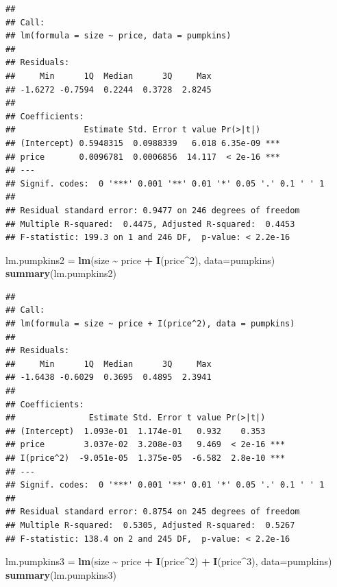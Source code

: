 \documentclass[
]{book}
\newenvironment{Shaded}{\begin{snugshade}}{\end{snugshade}}
\newcommand{\AttributeTok}[1]{\textcolor[rgb]{0.13,0.29,0.53}{#1}}
\newcommand{\DecValTok}[1]{\textcolor[rgb]{0.00,0.00,0.81}{#1}}
\newcommand{\FunctionTok}[1]{\textcolor[rgb]{0.13,0.29,0.53}{\textbf{#1}}}
\newcommand{\NormalTok}[1]{#1}
\newcommand{\OtherTok}[1]{\textcolor[rgb]{0.56,0.35,0.01}{#1}}
\newcommand{\SpecialCharTok}[1]{\textcolor[rgb]{0.81,0.36,0.00}{\textbf{#1}}}
\begin{document}
\begin{verbatim}
## 
## Call:
## lm(formula = size ~ price, data = pumpkins)
## 
## Residuals:
##     Min      1Q  Median      3Q     Max 
## -1.6272 -0.7594  0.2244  0.3728  2.8245 
## 
## Coefficients:
##              Estimate Std. Error t value Pr(>|t|)    
## (Intercept) 0.5948315  0.0988339   6.018 6.35e-09 ***
## price       0.0096781  0.0006856  14.117  < 2e-16 ***
## ---
## Signif. codes:  0 '***' 0.001 '**' 0.01 '*' 0.05 '.' 0.1 ' ' 1
## 
## Residual standard error: 0.9477 on 246 degrees of freedom
## Multiple R-squared:  0.4475, Adjusted R-squared:  0.4453 
## F-statistic: 199.3 on 1 and 246 DF,  p-value: < 2.2e-16
\end{verbatim}

\begin{Shaded}
\begin{Highlighting}[]
\NormalTok{lm.pumpkins2 }\OtherTok{=}  \FunctionTok{lm}\NormalTok{(size }\SpecialCharTok{\textasciitilde{}}\NormalTok{ price }\SpecialCharTok{+} \FunctionTok{I}\NormalTok{(price}\SpecialCharTok{\^{}}\DecValTok{2}\NormalTok{), }\AttributeTok{data=}\NormalTok{pumpkins)}
\FunctionTok{summary}\NormalTok{(lm.pumpkins2)}
\end{Highlighting}
\end{Shaded}

\begin{verbatim}
## 
## Call:
## lm(formula = size ~ price + I(price^2), data = pumpkins)
## 
## Residuals:
##     Min      1Q  Median      3Q     Max 
## -1.6438 -0.6029  0.3695  0.4895  2.3941 
## 
## Coefficients:
##               Estimate Std. Error t value Pr(>|t|)    
## (Intercept)  1.093e-01  1.174e-01   0.932    0.353    
## price        3.037e-02  3.208e-03   9.469  < 2e-16 ***
## I(price^2)  -9.051e-05  1.375e-05  -6.582  2.8e-10 ***
## ---
## Signif. codes:  0 '***' 0.001 '**' 0.01 '*' 0.05 '.' 0.1 ' ' 1
## 
## Residual standard error: 0.8754 on 245 degrees of freedom
## Multiple R-squared:  0.5305, Adjusted R-squared:  0.5267 
## F-statistic: 138.4 on 2 and 245 DF,  p-value: < 2.2e-16
\end{verbatim}

\begin{Shaded}
\begin{Highlighting}[]
\NormalTok{lm.pumpkins3 }\OtherTok{=}  \FunctionTok{lm}\NormalTok{(size }\SpecialCharTok{\textasciitilde{}}\NormalTok{ price }\SpecialCharTok{+} \FunctionTok{I}\NormalTok{(price}\SpecialCharTok{\^{}}\DecValTok{2}\NormalTok{) }\SpecialCharTok{+} \FunctionTok{I}\NormalTok{(price}\SpecialCharTok{\^{}}\DecValTok{3}\NormalTok{), }\AttributeTok{data=}\NormalTok{pumpkins)}
\FunctionTok{summary}\NormalTok{(lm.pumpkins3)}
\end{Highlighting}
\end{Shaded}
\end{document}
